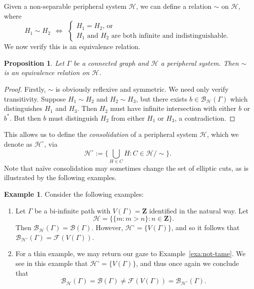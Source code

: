 \documentclass[11pt,a4paper]{amsart}
\newcommand{\Z}{\mathbf{Z}}
\newtheorem{proposition}[theorem]{Proposition}
\theoremstyle{definition}
\newtheorem{example}[theorem]{Example}
\newcommand{\per}{\mathcal{H}}
\newcommand{\br}{{\mathscr{B}}}
\begin{document}
Given a non-separable peripheral system $\per$, we can define a relation $\sim$ on $\per$, where 
$$
H_1 \sim H_2 \ \ \Longleftrightarrow \ \ 
\begin{cases}
    \text{$H_1 = H_2$, or}\\ \text{$H_1$ and $H_2$ are both infinite and indistinguishable.}
\end{cases}
$$
We now verify this is an equivalence relation.

\begin{proposition}
    Let $\Gamma$ be a connected graph and $\per$ a peripheral system. Then $\sim$ is an equivalence relation on $\per$. 
\end{proposition}

\begin{proof}
    Firstly, $\sim$ is obviously reflexive and symmetric. We need only verify transitivity. Suppose $H_1 \sim H_2$ and $H_2 \sim H_3$, but there exists $b \in \br _\per(\Gamma)$ which distinguishes $H_1$ and $H_3$. Then $H_2$ must have infinite intersection with either $b$ or $b^\ast$. But then $b$ must distinguish $H_2$ from either $H_1$ or $H_3$, a contradiction. 
\end{proof}

This allows us to define the \emph{consolidation} of a peripheral system $\per$, which we denote as $\per^\circ$, via
$$
\per^{\circ} := \Bigg\{ \bigcup_{H \in C} H : C \in \per /\sim\Bigg\}.
$$
Note that na\"ive consolidation may sometimes change the set of elliptic cuts, as is illustrated by the following examples. 

\begin{example}\label{exa:typei-reduction-changes-cuts}
    Consider the following examples:
    \begin{enumerate}
        \item Let $\Gamma$ be a bi-infinite path with $V(\Gamma) = \Z$ identified in the natural way. Let
    $$
    \per = \Big\{ \{m :  m> n\} : n \in \Z \Big\}.
    $$
    Then $\br_\per(\Gamma) = \br(\Gamma)$. However, $\per ^\circ = \{V(\Gamma)\}$, and so it follows that $\br_{\per^\circ}(\Gamma) = \mathscr F (V(\Gamma))$. 

    \item For a thin example, we may return our gaze to Example~\ref{exa:not-tame}. We see in this example that $\per^\circ = \{V(\Gamma)\}$, and thus once again we conclude that
    $$
    \br_\per(\Gamma) = \br(\Gamma) \neq  \mathscr F (V(\Gamma))= \br_{\per^\circ}(\Gamma).
    $$
    \end{enumerate}
    

    
\end{example}
\end{document}
